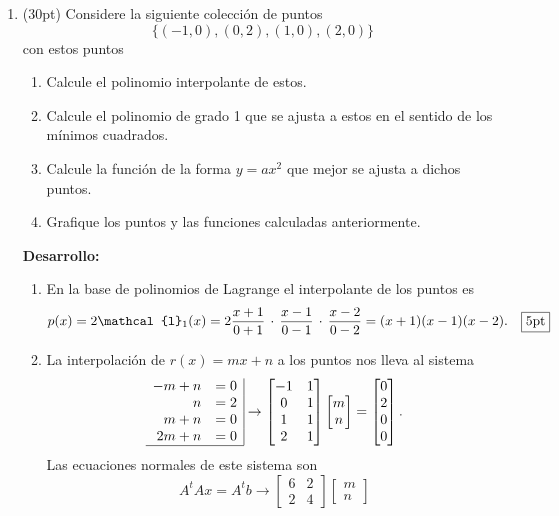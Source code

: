 \documentclass[11pt]{article}
\begin{document}
\begin{enumerate}
\item (30pt) Considere la siguiente colecci\'on de puntos
$$
\{(-1,0),(0,2),(1,0),(2,0)\}
$$
con estos puntos 
\begin{enumerate}
	\item Calcule el polinomio interpolante de estos.
    \item Calcule el polinomio de grado 1 que se ajusta a estos en el sentido de los m\'inimos cuadrados.
    \item Calcule la funci\'on de la forma $y=ax^2$ que mejor se ajusta a dichos puntos.
    \item Grafique los puntos y las funciones calculadas anteriormente.
\end{enumerate}
\textbf{Desarrollo:}
\begin{enumerate}
	\item En la base de polinomios de Lagrange el interpolante de los puntos es
$$
p(x)=2\mathcal{l}_1(x)= 2 	\frac{x+1}{0+1}\,\cdot\,
							\frac{x-1}{0-1}\,\cdot\,
                            \frac{x-2}{0-2}
                      =(x+1)(x-1)(x-2). \quad \fbox{5pt}
$$
	\item La interpolaci\'on de $r(x)=mx+n$ a los puntos nos lleva al sistema
$$
\begin{array}{rc|}
-m+n	&=0\\
n	&=2\\
m+n & =0 \\
2m+n & =0 \\ \hline
\end{array}
\rightarrow 
\begin{bmatrix}
-1 & 1 \\
0  & 1 \\
1 & 1 \\
2 & 1 
\end{bmatrix}
\begin{bmatrix} m \\ n \end{bmatrix}
=
\begin{bmatrix} 0\\2\\0\\0 \end{bmatrix}.
$$
Las ecuaciones normales de este sistema son
$$
A^tAx=A^tb \rightarrow
\begin{bmatrix} 6 & 2 	\\ 2 & 4 	\end{bmatrix}
\begin{bmatrix} m  		\\ n 		\end{bmatrix}
$$
\end{enumerate}
\end{enumerate}
\end{document}

